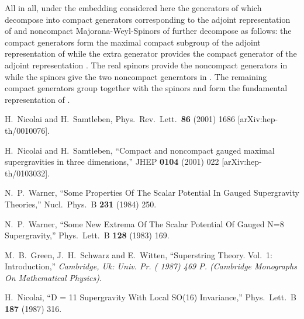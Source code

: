 \documentclass[a4paper,12pt]{article}
\begin{document}
All in all, under the \coordHE{}
embedding considered here the \coordHE{} generators of \coordHE{} which
decompose into \coordHE{} compact generators corresponding to the adjoint
representation of \coordHE{} and \coordHE{} noncompact Majorana-Weyl-Spinors
of \coordHE{} further decompose as follows: the compact \coordHE{}  \coordHE{}
generators form the maximal compact subgroup of the \coordHE{} adjoint
representation of \coordHE{} while the extra \coordHE{} generator
provides the compact generator of the adjoint \coordHE{} representation
\coordHE{}. The \coordHE{} real spinors \coordHE{} provide the \coordHE{} noncompact generators in
\coordHE{} while the spinors \myHighlight{$\psi^{\pm}_{}$}\coordHE{} give the two noncompact
generators in \coordHE{}. The remaining \coordHE{} compact generators group
together with the \coordHE{} spinors and form the
\coordHE{} fundamental representation of \coordHE{}.

\newpage

\begingroup\raggedright\begin{thebibliography}{10}

H.~Nicolai and H.~Samtleben,
Phys.\ Rev.\ Lett.\  {\bf 86} (2001) 1686
[arXiv:hep-th/0010076].

H.~Nicolai and H.~Samtleben,
``Compact and noncompact gauged maximal supergravities in three  dimensions,''
JHEP {\bf 0104} (2001) 022
[arXiv:hep-th/0103032].

N.~P.~Warner,
``Some Properties Of The Scalar Potential In Gauged Supergravity Theories,''
Nucl.\ Phys.\ B {\bf 231} (1984) 250.

N.~P.~Warner,
``Some New Extrema Of The Scalar Potential Of Gauged N=8 Supergravity,''
Phys.\ Lett.\ B {\bf 128} (1983) 169.

M.~B.~Green, J.~H.~Schwarz and E.~Witten,
``Superstring Theory. Vol.~1: Introduction,''
{\it  Cambridge, Uk: Univ. Pr. ( 1987) 469 P. (Cambridge Monographs On Mathematical Physics)}.

H.~Nicolai,
``D = 11 Supergravity With Local SO(16) Invariance,''
Phys.\ Lett.\ B {\bf 187} (1987) 316.

\end{thebibliography}\endgroup
\end{document}

